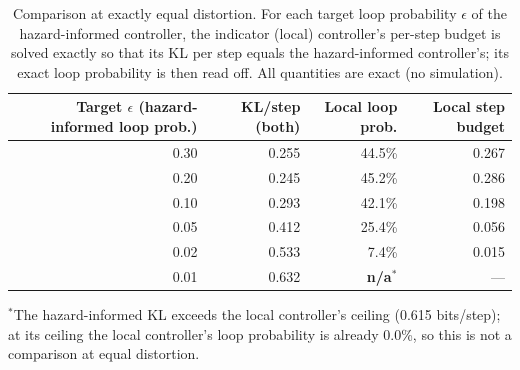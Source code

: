 \begin{table}[ht]
\centering
\caption{Comparison at exactly equal distortion. For each target loop probability $\epsilon$ of the hazard-informed controller, the indicator (local) controller's per-step budget is solved exactly so that its KL per step equals the hazard-informed controller's; its exact loop probability is then read off. All quantities are exact (no simulation).}
\label{tab:synthetic}
\begin{tabular}{@{}rrrr@{}}
\toprule
Target $\epsilon$ (hazard-informed loop prob.) & KL/step (both) & Local loop prob. & Local step budget \\
\midrule
0.30 & 0.255 & 44.5\% & 0.267 \\
0.20 & 0.245 & 45.2\% & 0.286 \\
0.10 & 0.293 & 42.1\% & 0.198 \\
0.05 & 0.412 & 25.4\% & 0.056 \\
0.02 & 0.533 & 7.4\% & 0.015 \\
0.01 & 0.632 & \textbf{n/a}$^{*}$ & --- \\
\bottomrule
\end{tabular}

\vspace{4pt}
{\footnotesize $^{*}$The hazard-informed KL exceeds the local controller's ceiling (0.615 bits/step); at its ceiling the local controller's loop probability is already 0.0\%, so this is not a comparison at equal distortion.}
\end{table}